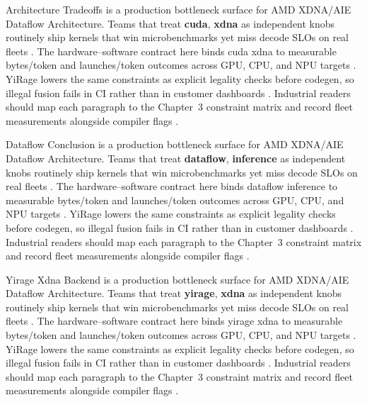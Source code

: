 Architecture Tradeoffs is a production bottleneck surface for AMD XDNA/AIE Dataflow Architecture. Teams that treat \textbf{cuda}, \textbf{xdna} as independent knobs routinely ship kernels that win microbenchmarks yet miss decode SLOs on real fleets \citep{dao2022flashattention,liu2024deepseekv3}. The hardware--software contract here binds cuda xdna to measurable bytes/token and launches/token outcomes across GPU, CPU, and NPU targets \citep{kwon2023vllm,patel2025llminference}. YiRage lowers the same constraints as explicit legality checks before codegen, so illegal fusion fails in CI rather than in customer dashboards \citep{nvidia2024cudagraphs,taxbreak2026}. Industrial readers should map each paragraph to the Chapter~3 constraint matrix and record fleet measurements alongside compiler flags \citep{liu2024deepseekv3,memoryfloor2026}.

Dataflow Conclusion is a production bottleneck surface for AMD XDNA/AIE Dataflow Architecture. Teams that treat \textbf{dataflow}, \textbf{inference} as independent knobs routinely ship kernels that win microbenchmarks yet miss decode SLOs on real fleets \citep{kwon2023vllm,patel2025llminference}. The hardware--software contract here binds dataflow inference to measurable bytes/token and launches/token outcomes across GPU, CPU, and NPU targets \citep{nvidia2024cudagraphs,taxbreak2026}. YiRage lowers the same constraints as explicit legality checks before codegen, so illegal fusion fails in CI rather than in customer dashboards \citep{liu2024deepseekv3,memoryfloor2026}. Industrial readers should map each paragraph to the Chapter~3 constraint matrix and record fleet measurements alongside compiler flags \citep{patel2025llminference,nvidia2022hopper}.

Yirage Xdna Backend is a production bottleneck surface for AMD XDNA/AIE Dataflow Architecture. Teams that treat \textbf{yirage}, \textbf{xdna} as independent knobs routinely ship kernels that win microbenchmarks yet miss decode SLOs on real fleets \citep{nvidia2024cudagraphs,taxbreak2026}. The hardware--software contract here binds yirage xdna to measurable bytes/token and launches/token outcomes across GPU, CPU, and NPU targets \citep{liu2024deepseekv3,memoryfloor2026}. YiRage lowers the same constraints as explicit legality checks before codegen, so illegal fusion fails in CI rather than in customer dashboards \citep{patel2025llminference,nvidia2022hopper}. Industrial readers should map each paragraph to the Chapter~3 constraint matrix and record fleet measurements alongside compiler flags \citep{taxbreak2026,semianalysis2024tma}.

